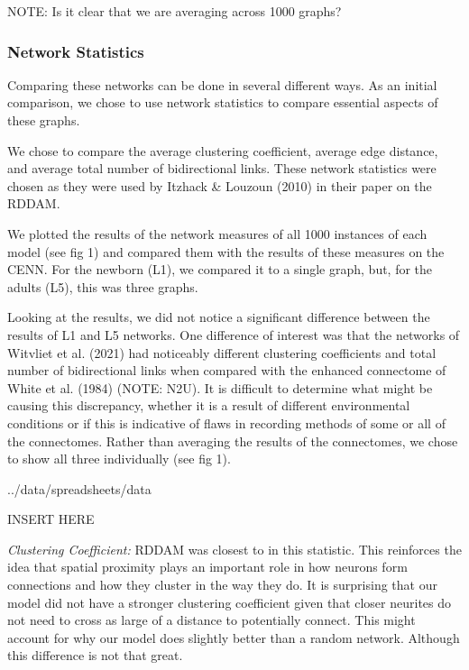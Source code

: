 NOTE: Is it clear that we are averaging across 1000 graphs?

\subsubsection{Network Statistics}
Comparing these networks can be done in several different ways. As an initial comparison, we chose to use network statistics to compare essential aspects of these graphs. 

We chose to compare the average clustering coefficient, average edge distance, and average total number of bidirectional links. These network statistics were chosen as they were used by Itzhack \& Louzoun (2010) in their paper on the RDDAM. 

We plotted the results of the network measures of all 1000 instances of each model (see fig 1) and compared them with the results of these measures on the CENN. For the newborn (L1), we compared it to a single graph, but, for the adults (L5), this was three graphs.


Looking at the results, we did not notice a significant difference between the results of L1 and L5 networks. One difference of interest was that the networks of Witvliet et al. (2021) had noticeably different clustering coefficients and total number of bidirectional links when compared with the enhanced connectome of White et al. (1984) (NOTE: N2U). It is difficult to determine what might be causing this discrepancy, whether it is a result of different environmental conditions or if this is indicative of flaws in recording methods of some or all of the connectomes. Rather than averaging the results of the connectomes, we chose to show all three individually (see fig 1). 

\begin{table}[h]
  {../data/spreadsheets/data}
  \caption{INSERT HERE}
\end{table}

\textit{Clustering Coefficient:} RDDAM was closest to \ce in this statistic. This reinforces the idea that spatial proximity plays an important role in how neurons form connections and how they cluster in the way they do. It is surprising that our model did not have a stronger clustering coefficient given that closer neurites do not need to cross as large of a distance to potentially connect. This might account for why our model does slightly better than a random network. Although this difference is not that great.

